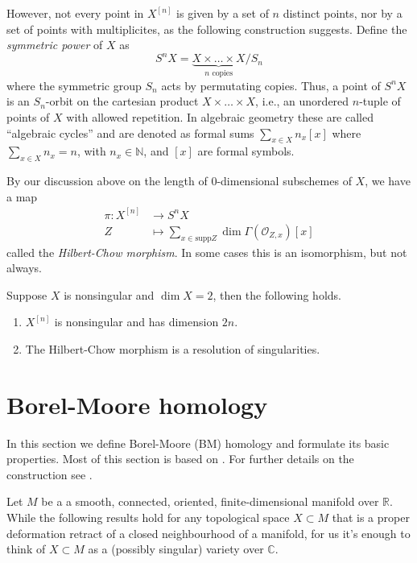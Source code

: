 \medskip\noindent
However, not every point in $X^{[n]}$ is given
by a set of $n$ distinct points,
nor by a set of points with multiplicites,
as the following construction suggests.
Define the {\it symmetric power} of $X$ as
$$
S^nX=\underbrace{X \times \ldots \times X}_{n\text{ copies}}/S_n
$$
where the symmetric group $S_n$ acts by
permutating copies. Thus, a point of $S^nX$ is
an $S_n$-orbit on the cartesian product $X \times \ldots \times X$,
i.e., an unordered $n$-tuple of points of $X$
with allowed repetition.
In algebraic geometry these are called ``algebraic cycles''
and are denoted as formal sums $\sum_{x \in X}n_x[x]$ 
where $\sum_{x \in X}n_x=n$, with $n_x \in \mathbb{N}$,
and $[x]$ are formal symbols.

By our discussion above on the length of 0-dimensional subschemes of $X$,
we have a map
\begin{align*}
\pi : X^{[n]} &\longrightarrow S^nX \\
 Z&\longmapsto \sum_{x \in \text{supp}Z}\dim
\Gamma(\mathcal{O}_{Z,x})[x]
\end{align*}
called the {\it Hilbert-Chow morphism}.
In some cases this is an isomorphism, but not always.

\begin{theorem}
\label{theorem-fogarty}
Suppose $X$ is nonsingular and $\dim X=2$,
then the following holds.
\begin{enumerate}
\item $X^{[n]}$ is nonsingular and has dimension $2n$.
\item The Hilbert-Chow morphism is a resolution of singularities.
\end{enumerate}
\end{theorem}




\section{Borel-Moore homology}
\label{section-bm}

\noindent
In this section we define Borel-Moore (BM) homology
and formulate its basic properties.
Most of this section is based on \cite[Video 9]{videos}.
For further details on the construction see \cite{Fulton-Young-Tableaux}.

\medskip\noindent
Let $M$ be a a smooth, connected,
oriented, finite-dimensional manifold over $\mathbb{R}$.
While the following results hold for any
topological space $X \subset M$
that is a proper deformation retract
of a closed neighbourhood of a manifold,
for us it's enough to think of $X \subset M$ as a
(possibly singular) variety over $\mathbb{C}$.

